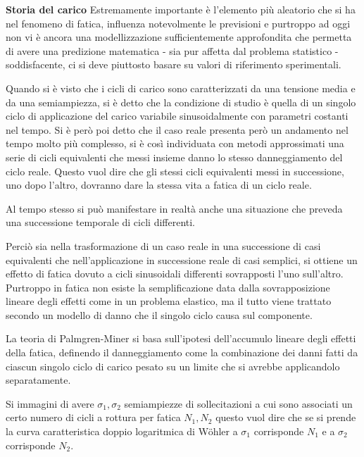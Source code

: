 \documentclass{article}
\begin{document}
\begin{adjustwidth}{2in}{}
			 \textbf{\Large Storia del carico}\newline
			 Estremamente importante è l'elemento più aleatorio che si ha nel fenomeno di fatica, influenza notevolmente le previsioni e purtroppo ad oggi non vi è ancora una modellizzazione sufficientemente approfondita che permetta di avere una predizione matematica - sia pur affetta dal problema statistico - soddisfacente, ci si deve piuttosto basare su valori di riferimento sperimentali. \newline
			 
			 Quando si è visto che i cicli di carico sono caratterizzati da una tensione media e da una semiampiezza, si è detto che la condizione di studio è quella   di un singolo ciclo di applicazione del carico variabile sinusoidalmente con parametri costanti nel tempo. Si è però poi detto che il caso reale presenta però un andamento nel tempo molto più complesso, si è così individuata con metodi approssimati una serie di cicli equivalenti che messi insieme danno lo stesso danneggiamento del ciclo reale. Questo vuol dire che gli stessi cicli equivalenti messi in successione, uno dopo l'altro, dovranno dare la stessa vita a fatica di un ciclo reale.
			 
			 Al tempo stesso si può manifestare in realtà anche una situazione che preveda una successione temporale di cicli differenti.
			 
			 Perciò sia nella trasformazione di un caso reale in una successione di casi equivalenti che nell'applicazione in successione reale di casi semplici, si ottiene un effetto di fatica dovuto a cicli sinusoidali differenti sovrapposti l'uno sull'altro. Purtroppo in fatica non esiste la semplificazione data dalla
			 sovrapposizione lineare degli effetti come in un problema elastico, ma il tutto viene trattato secondo un modello di danno che il singolo ciclo causa sul componente.\newline
			 
			 La teoria di
			 Palmgren-Miner si basa sull’ipotesi dell’accumulo lineare degli effetti della fatica, definendo il danneggiamento come la combinazione dei danni fatti da ciascun singolo ciclo di carico pesato su un limite che si avrebbe applicandolo separatamente.\newpage
			 
			 Si immagini di avere $\sigma_1, \sigma_2$ semiampiezze di sollecitazioni a cui sono associati un certo numero di cicli a rottura per fatica $ N_1, N_2 $ questo vuol dire che se si prende la curva caratteristica doppio logaritmica di Wöhler a $ \sigma_1 $ corrisponde $ N_1 $ e a $ \sigma_2 $ corrisponde $ N_2 $.
			 		

\end{adjustwidth}
\end{document}
